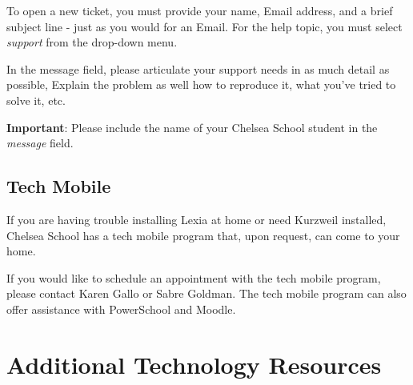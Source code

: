 \documentclass[letterpaper,10pt,english]{sphinxmanual}
\begin{document}
To open a new ticket, you must provide your name, Email address, and a brief subject line - just as you would for an Email. For the help topic, you must select \emph{support} from the drop-down menu.

In the message field, please articulate your support needs in as much detail as possible, Explain the problem as well how to reproduce it, what you've tried to solve it, etc.

{\hfill{}\hfill}

\textbf{Important}: Please include the name of your Chelsea School student in the \emph{message} field.


\section{Tech Mobile}
\label{helpdesk:tech-mobile}\label{helpdesk:osticket}
If you are having trouble installing Lexia at home or need Kurzweil installed, Chelsea School has a tech mobile program that, upon request, can come to your home.

If you would like to schedule an appointment with the tech mobile program, please contact Karen Gallo or Sabre Goldman.  The tech mobile program can also offer assistance with PowerSchool and Moodle.


\chapter{Additional Technology Resources}
\label{resources::doc}\label{resources:index-0}\label{resources:additional-technology-resources}
\end{document}
